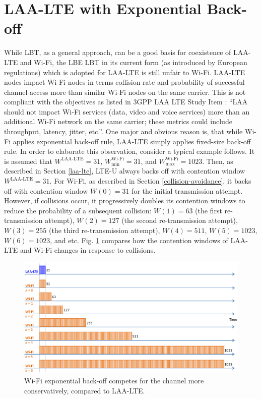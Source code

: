 \section{LAA-LTE with Exponential Back-off}
\label{subsection:exp-back-off}

While LBT, as a general approach, can be a good basis for coexistence of \mbox{LAA-LTE} and \mbox{Wi-Fi}, the LBE LBT in its current form (as introduced by European regulations) which is adopted for \mbox{LAA-LTE} is still unfair to \mbox{Wi-Fi}. \mbox{LAA-LTE} nodes impact \mbox{Wi-Fi} nodes in terms collision rate and probability of successful channel access more than similar \mbox{Wi-Fi} nodes on the same carrier. This is not compliant with the objectives as listed in 3GPP LAA LTE Study Item \cite{LAA-LTE-SI}: ``LAA should not impact \mbox{Wi-Fi} services (data, video and voice services) more than an additional \mbox{Wi-Fi} network on the same carrier; these metrics could include throughput, latency, jitter, etc.''. One major and obvious reason is, that while \mbox{Wi-Fi} applies exponential back-off rule, \mbox{LAA-LTE} simply applies fixed-size back-off rule. In order to elaborate this observation, consider a typical example follows. It is assumed that $W^{\mathrm{\mbox{LAA-LTE}}}=31$, $W^{\mbox{Wi-Fi}}_{\min}=31$, and $W^{\mathrm{\mbox{Wi-Fi}}}_{\max}=1023$. Then, as described in Section \ref{laa-lte}, \mbox{LTE-U} always backs off with contention window $W^{\mathrm{\mbox{LAA-LTE}}}=31$. For \mbox{Wi-Fi}, as described in Section \ref{collision-avoidance}, it backs off with contention window $W(0)=31$ for the initial transmission attempt. However, if collisions occur, it progressively doubles its contention windows to reduce the probability of a subsequent collision: $W(1)=63$ (the first re-transmission attempt), $W(2)=127$ (the second re-transmission attempt), $W(3)=255$ (the third re-transmission attempt), $W(4)=511$, $W(5)=1023$, $W(6)=1023$, and etc. Fig. \ref{figs:LAA-LTE-enhacement-back-off} compares how the contention windows of \mbox{LAA-LTE} and \mbox{Wi-Fi} changes in response to collisions.
\begin{figure}[!ht]
	\centering
	\includegraphics[width=1.0\columnwidth]{figs/LAA-LTE-enhacement-back-off}
	\caption{\mbox{Wi-Fi} exponential back-off competes for the channel more conservatively, compared to \mbox{LAA-LTE}.}
	\label{figs:LAA-LTE-enhacement-back-off}
\end{figure}

